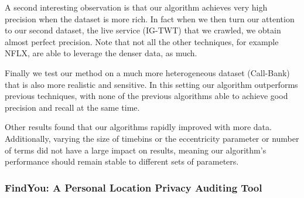 A second interesting observation is that our algorithm achieves very high precision when the dataset is more rich. 
In fact when we then turn our attention to our second dataset, the live service (IG-TWT) that we crawled, we obtain almost perfect precision. 
Note that not all the other techniques, for example NFLX, are able to leverage the denser data, as much.

Finally we test our method on a much more heterogeneous dataset (Call-Bank) that is also more realistic and sensitive. 
In this setting our algorithm outperforms previous techniques, with none of the previous algorithms able to achieve good precision and recall at the same time. 

Other results found that our algorithms rapidly improved with more data.
Additionally, varying the size of timebins or the eccentricity parameter or number of terms did not have a large impact on results, meaning our algorithm's performance should remain stable to different sets of parameters.



\subsubsection{FindYou: A Personal Location Privacy Auditing Tool}
